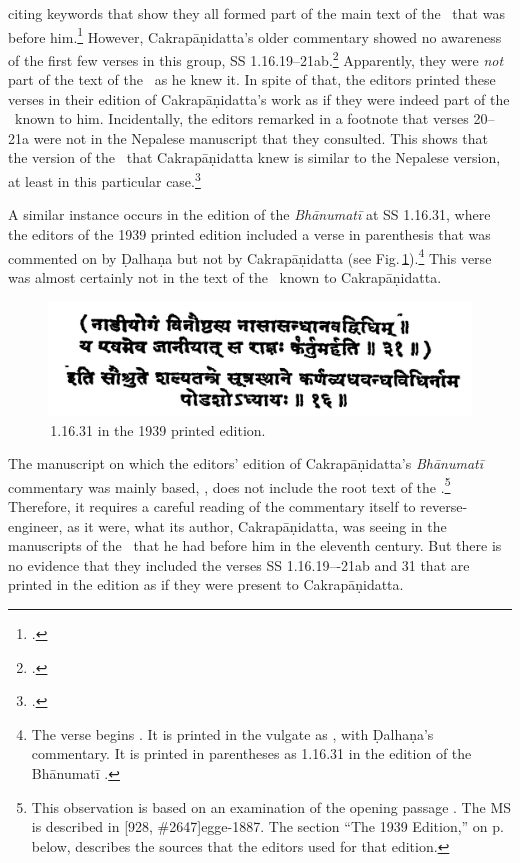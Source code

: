 citing keywords that show they all formed part of the main text of the \SS\ that
was before him.\footnote{.} However, Cakrapāṇidatta's
    older commentary showed no awareness of the first few verses in this group, SS
    1.16.19--21ab.\footcite[130--131]{acar-1939}  Apparently, they were \emph{not}
    part of the text of the \SS\ as he knew it.  In spite of that, the editors printed
    these verses in their edition of Cakrapāṇidatta's work as if they were indeed part
    of the \SS\ known to him. Incidentally, the editors remarked in a footnote that
    verses 20--21a were not in the Nepalese manuscript that they consulted.  This
    shows that the version of the \SS\ that Cakrapāṇidatta knew is similar to the
    Nepalese version, at least in this particular case.\footcite[130, n.\,2]{acar-1939}

A similar instance occurs in the edition of the \emph{Bhānumatī} at SS 1.16.31, 
where the editors of the 1939 printed edition included a verse in parenthesis that was
commented on by Ḍalhaṇa but not by Cakrapāṇidatta (see 
Fig.\,\ref{fig:nadiyogam}).\footnote{The verse begins 
.  It is printed in the vulgate as 
, with Ḍalhaṇa's commentary.  It is printed in parentheses as 1.16.31 in the 
edition of the Bhānumatī \citep[133]{acar-1939}.} This verse was almost certainly not in the 
text of the \SS\ known to Cakrapāṇidatta. 
\begin{figure}[t]
    \centering
    \includegraphics[draft=false,width=.90\linewidth]
    {media/nadiyogam-upscaled}
    \caption{\SS\,1.16.31 in the 1939 printed edition.}
    \label{fig:nadiyogam}
\end{figure}
The manuscript on which the editors' edition of Cakrapāṇidatta's \emph{Bhānumatī}
commentary was mainly based,  , does not
include the root text of the \SS.\footnote{This observation is based on an
    examination of the opening passage . The MS
    is described in [928, \#2647]{egge-1887}. %
    The section “The 1939 Edition,” on p.\,\pageref{1939edition} below, describes
    the sources that the editors used for that edition.}  Therefore, it requires a
    careful reading of the commentary itself to reverse-engineer, as it were, what
    its author, Cakrapāṇidatta, was seeing in the manuscripts of the \SS\ that he
    had before him in the eleventh century. But there is no evidence that they
    included the verses SS 1.16.19–-21ab and 31 that are printed in the
    \cite{acar-1939} edition as if they were present to Cakrapāṇidatta.

